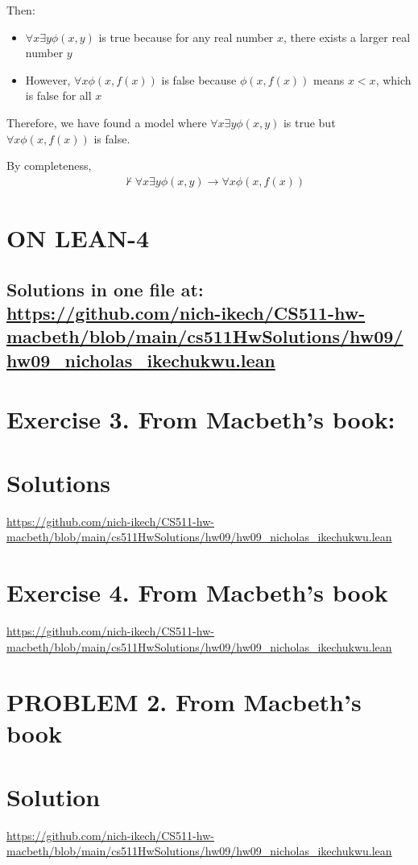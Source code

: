 \documentclass{article}
\begin{document}
\vspace{1em}
Then:
\begin{itemize}
\item $\forall x \exists y \phi(x,y)$ is true because for any real number $x$, there exists a larger real number $y$
\item However, $\forall x \phi(x,f(x))$ is false because $\phi(x,f(x))$ means $x < x$, which is false for all $x$
\end{itemize}

Therefore, we have found a model where $\forall x \exists y \phi(x,y)$ is true but $\forall x \phi(x,f(x))$ is false.

By completeness, 
\[\begin{aligned}
    & \not \vdash \forall x \exists y \phi(x,y) \rightarrow \forall x \phi(x,f(x))
\end{aligned}\]

\newpage




\section*{ON LEAN-4}
\subsection*{Solutions in one file at: 
\url{https://github.com/nich-ikech/CS511-hw-macbeth/blob/main/cs511HwSolutions/hw09/hw09_nicholas_ikechukwu.lean}}

\newpage

\section*{Exercise 3. From Macbeth’s book:}
\section*{Solutions}
\url{https://github.com/nich-ikech/CS511-hw-macbeth/blob/main/cs511HwSolutions/hw09/hw09_nicholas_ikechukwu.lean}

\newpage

\section*{Exercise 4. From Macbeth's book}

\url{https://github.com/nich-ikech/CS511-hw-macbeth/blob/main/cs511HwSolutions/hw09/hw09_nicholas_ikechukwu.lean}

\newpage

\section*{PROBLEM 2. From Macbeth's book}
\section*{Solution}

\url{https://github.com/nich-ikech/CS511-hw-macbeth/blob/main/cs511HwSolutions/hw09/hw09_nicholas_ikechukwu.lean}
\end{document}
